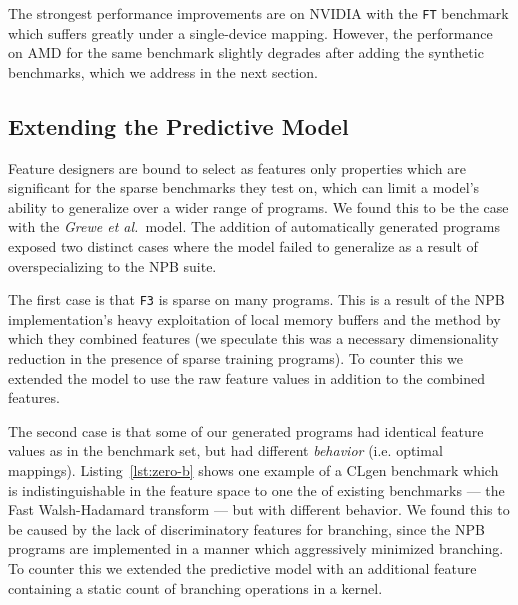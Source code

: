 The strongest performance improvements are on NVIDIA with the \texttt{FT} benchmark which suffers greatly under a single-device mapping. However, the performance on AMD for the same benchmark slightly degrades after adding the synthetic benchmarks, which we address in the next section.

\subsection{Extending the Predictive Model}%
\label{subsec:eval-extended}



Feature designers are bound to select as features only properties which are significant for the sparse benchmarks they test on, which can limit a model's ability to generalize over a wider range of programs. We found this to be the case with the \emph{Grewe et al.\ }model. The addition of automatically generated programs exposed two distinct cases where the model failed to generalize as a result of overspecializing to the NPB suite.

The first case is that \texttt{F3} is sparse on many programs. This is a result of the NPB implementation's heavy exploitation of local memory buffers and the method by which they combined features (we speculate this was a necessary dimensionality reduction in the presence of sparse training programs). To counter this we extended the model to use the raw feature values in addition to the combined features.

The second case is that some of our generated programs had identical feature values as in the benchmark set, but had different \emph{behavior} (i.e. optimal mappings). Listing~\ref{lst:zero-b} shows one example of a CLgen benchmark which is indistinguishable in the feature space to one the of existing benchmarks --- the Fast Walsh-Hadamard transform --- but with different behavior. We found this to be caused by the lack of discriminatory features for branching, since the NPB programs are implemented in a manner which aggressively minimized branching. To counter this we extended the predictive model with an additional feature containing a static count of branching operations in a kernel.

